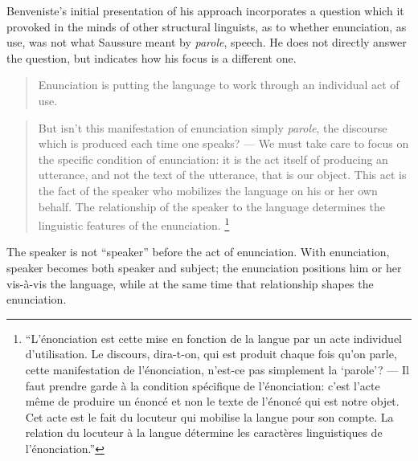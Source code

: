 \documentclass[output=paper]{langscibook}
\begin{document}
Benveniste's initial presentation of his approach incorporates a question which it provoked in the minds of other structural linguists, as to whether enunciation, as use, was not what Saussure meant by \emph{parole}, speech. He does not directly answer the question, but indicates how his focus is a different one.

\begin{quotation}
Enunciation is putting the language to work through an individual act of use.
\end{quotation}

\begin{quotation}
But isn't this manifestation of enunciation simply \emph{parole}, the discourse which is produced each time one speaks? — We must take care to focus on the specific condition of enunciation: it is the act itself of producing an utterance, and not the text of the utterance, that is our object. This act is the fact of the speaker who mobilizes the language on his or her own behalf. The relationship of the speaker to the language determines the linguistic features of the enunciation. \citep[80]{Benveniste1970appareil}\footnote{``L'énonciation est cette mise en fonction de la langue par un acte individuel d'utilisation. Le discours, dira-t-on, qui est produit chaque fois qu'on parle, cette manifestation de l'énonciation, n'est-ce pas simplement la `parole'? — Il faut prendre garde à la condition spécifique de l'énonciation: c’est l'acte même de produire un énoncé et non le texte de l'énoncé qui est notre objet. Cet acte est le fait du locuteur qui mobilise la langue pour son compte. La relation du locuteur à la langue détermine les caractères linguistiques de l'énonciation.''}
\end{quotation}

The speaker is not ``speaker'' before the act of enunciation. With enunciation, speaker becomes both speaker and subject; the enunciation positions him or her vis-à-vis the language, while at the same time that relationship shapes the enunciation.
\end{document}
